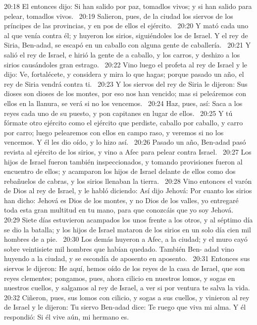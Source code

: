 20:18 El entonces dijo: Si han salido por paz, tomadlos vivos; y si han salido para pelear, tomadlos vivos.  
20:19 Salieron, pues, de la ciudad los siervos de los príncipes de las provincias, y en pos de ellos el ejército.  
20:20 Y mató cada uno al que venía contra él; y huyeron los sirios, siguiéndoles los de Israel. Y el rey de Siria, Ben-adad, se escapó en un caballo con alguna gente de caballería.  
20:21 Y salió el rey de Israel, e hirió la gente de a caballo, y los carros, y deshizo a los sirios causándoles gran estrago.  
20:22 Vino luego el profeta al rey de Israel y le dijo: Ve, fortalécete, y considera y mira lo que hagas; porque pasado un año, el rey de Siria vendrá contra ti.  
20:23 Y los siervos del rey de Siria le dijeron: Sus dioses son dioses de los montes, por eso nos han vencido; mas si peleáremos con ellos en la llanura, se verá si no los vencemos.  
20:24 Haz, pues, así: Saca a los reyes cada uno de su puesto, y pon capitanes en lugar de ellos.  
20:25 Y tú fórmate otro ejército como el ejército que perdiste, caballo por caballo, y carro por carro; luego pelearemos con ellos en campo raso, y veremos si no los vencemos. Y él les dio oído, y lo hizo así.  
20:26 Pasado un año, Ben-adad pasó revista al ejército de los sirios, y vino a Afec para pelear contra Israel.  
20:27 Los hijos de Israel fueron también inspeccionados, y tomando provisiones fueron al encuentro de ellos; y acamparon los hijos de Israel delante de ellos como dos rebañuelos de cabras, y los sirios llenaban la tierra.  
20:28 Vino entonces el varón de Dios al rey de Israel, y le habló diciendo: Así dijo Jehová: Por cuanto los sirios han dicho: Jehová es Dios de los montes, y no Dios de los valles, yo entregaré toda esta gran multitud en tu mano, para que conozcáis que yo soy Jehová.  
20:29 Siete días estuvieron acampados los unos frente a los otros, y al séptimo día se dio la batalla; y los hijos de Israel mataron de los sirios en un solo día cien mil hombres de a pie.  
20:30 Los demás huyeron a Afec, a la ciudad; y el muro cayó sobre veintisiete mil hombres que habían quedado. También Ben- adad vino huyendo a la ciudad, y se escondía de aposento en aposento.  
20:31 Entonces sus siervos le dijeron: He aquí, hemos oído de los reyes de la casa de Israel, que son reyes clementes; pongamos, pues, ahora cilicio en nuestros lomos, y sogas en nuestros cuellos, y salgamos al rey de Israel, a ver si por ventura te salva la vida.  
20:32 Ciñeron, pues, sus lomos con cilicio, y sogas a sus cuellos, y vinieron al rey de Israel y le dijeron: Tu siervo Ben-adad dice: Te ruego que viva mi alma. Y él respondió: Si él vive aún, mi hermano es.  
